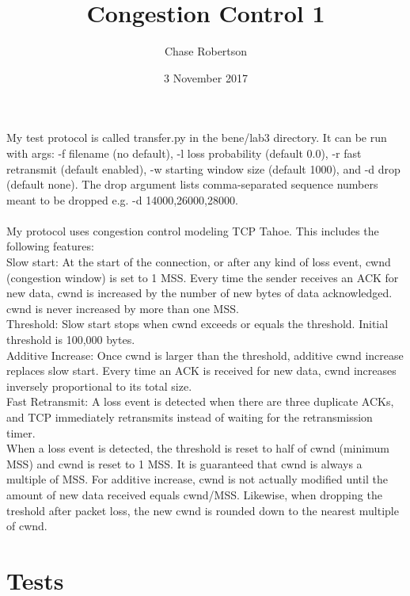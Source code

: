 \documentclass[fleqn,11pt]{article}
\begin{document}
\title{Congestion Control 1}

\author{Chase Robertson}

\date{3 November 2017}

\maketitle

My test protocol is called transfer.py in the bene/lab3 directory. It can be run with args: -f filename (no default), -l loss probability (default 0.0), -r fast retransmit (default enabled), -w starting window size (default 1000), and -d drop (default none). The drop argument lists comma-separated sequence numbers meant to be dropped e.g. -d 14000,26000,28000. \\
\\
My protocol uses congestion control modeling TCP Tahoe. This includes the following features: \\

Slow start: At the start of the connection, or after any kind of loss event, cwnd (congestion window) is set to 1 MSS. Every time the sender receives an ACK for new data, cwnd is increased by the number of new bytes of data acknowledged. cwnd is never increased by more than one MSS. \\

Threshold: Slow start stops when cwnd exceeds or equals the threshold. Initial threshold is 100,000 bytes. \\

Additive Increase: Once cwnd is larger than the threshold, additive cwnd increase replaces slow start. Every time an ACK is received for new data, cwnd increases inversely proportional to its total size. \\

Fast Retransmit: A loss event is detected when there are three duplicate ACKs, and TCP immediately retransmits instead of waiting for the retransmission timer. \\

When a loss event is detected, the threshold is reset to half of cwnd (minimum MSS) and cwnd is reset to 1 MSS. It is guaranteed that cwnd is always a multiple of MSS. For additive increase, cwnd is not actually modified until the amount of new data received equals cwnd/MSS. Likewise, when dropping the treshold after packet loss, the new cwnd is rounded down to the nearest multiple of cwnd.
\newpage
\section{Tests}
\end{document}
